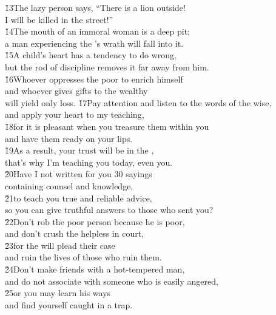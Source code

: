 \begin{poetry}
\poeml \v{13}The lazy person says, ``There is a lion outside! \\
\poemll    I will be killed in the street!'' \\
\poeml \v{14}The mouth of an immoral woman is a deep pit; \\
\poemll    a man experiencing the 's wrath will fall into it. \\
\poeml \v{15}A child's heart has a tendency to do wrong, \\
\poemll    but the rod of discipline removes it far away from him. \\
\poeml \v{16}Whoever oppresses the poor to enrich himself \\
\poemll    and whoever gives gifts to the wealthy \\
\poemlll       will yield only loss.
\poeml \v{17}Pay attention and listen to the words of the wise, \\
\poemll    and apply your heart to my teaching, \\
\poeml \v{18}for it is pleasant when you treasure them within you \\
\poemll    and have them ready on your lips. \\
\poeml \v{19}As a result, your trust will be in the , \\
\poemll    that's why I'm teaching you today, even you. \\
\poeml \v{20}Have I not written for you 30 sayings \\
\poemll    containing counsel and knowledge, \\
\poeml \v{21}to teach you true and reliable advice, \\
\poemll    so you can give truthful answers to those who sent you? \\
\poeml \v{22}Don't rob the poor person because he is poor, \\
\poemll    and don't crush the helpless in court, \\
\poeml \v{23}for the  will plead their case \\
\poemll    and ruin the lives of those who ruin them. \\
\poeml \v{24}Don't make friends with a hot-tempered man, \\
\poemll    and do not associate with someone who is easily angered, \\
\poeml \v{25}or you may learn his ways \\
\poemll    and find yourself caught in a trap. \\

\end{poetry}
